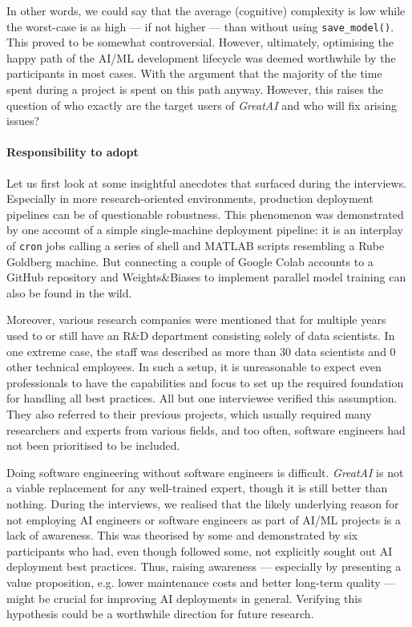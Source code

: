 In other words, we could say that the average (cognitive) complexity is low while the worst-case is as high --- if not higher --- than without using \texttt{save\_model()}. This proved to be somewhat controversial. However, ultimately, optimising the happy path of the AI/ML development lifecycle was deemed worthwhile by the participants in most cases. With the argument that the majority of the time spent during a project is spent on this path anyway. However, this raises the question of who exactly are the target users of \textit{GreatAI} and who will fix arising issues?

\paragraph{Responsibility to adopt} Let us first look at some insightful anecdotes that surfaced during the interviews. Especially in more research-oriented environments, production deployment pipelines can be of questionable robustness. This phenomenon was demonstrated by one account of a simple single-machine deployment pipeline: it is an interplay of \texttt{cron} jobs calling a series of shell and MATLAB scripts resembling a Rube Goldberg machine. But connecting a couple of Google Colab accounts to a GitHub repository and Weights\&Biases to implement parallel model training can also be found in the wild.

Moreover, various research companies were mentioned that for multiple years used to or still have an R\&D department consisting solely of data scientists. In one extreme case, the staff was described as more than 30 data scientists and 0 other technical employees. In such a setup, it is unreasonable to expect even professionals to have the capabilities and focus to set up the required foundation for handling all best practices. All but one interviewee verified this assumption. They also referred to their previous projects, which usually required many researchers and experts from various fields, and too often, software engineers had not been prioritised to be included.

Doing software engineering without software engineers is difficult. \textit{GreatAI} is not a viable replacement for any well-trained expert, though it is still better than nothing. During the interviews, we realised that the likely underlying reason for not employing AI engineers or software engineers as part of AI/ML projects is a lack of awareness. This was theorised by some and demonstrated by six participants who had, even though followed some, not explicitly sought out AI deployment best practices. Thus, raising awareness --- especially by presenting a value proposition, e.g. lower maintenance costs and better long-term quality --- might be crucial for improving AI deployments in general. Verifying this hypothesis could be a worthwhile direction for future research.

